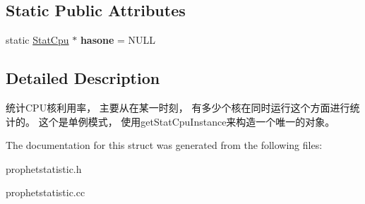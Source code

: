 \subsection*{Static Public Attributes}
\begin{DoxyCompactItemize}
\item 
\hypertarget{structProphetStat_1_1StatCpu_a23a77b4ddaf86f71fe1c4aed534ff303}{
static \hyperlink{structProphetStat_1_1StatCpu}{StatCpu} $\ast$ {\bfseries hasone} = NULL}
\label{structProphetStat_1_1StatCpu_a23a77b4ddaf86f71fe1c4aed534ff303}

\end{DoxyCompactItemize}


\subsection{Detailed Description}
统计CPU核利用率， 主要从在某一时刻， 有多少个核在同时运行这个方面进行统计的。 这个是单例模式， 使用getStatCpuInstance来构造一个唯一的对象。 

The documentation for this struct was generated from the following files:\begin{DoxyCompactItemize}
\item 
prophetstatistic.h\item 
prophetstatistic.cc\end{DoxyCompactItemize}
